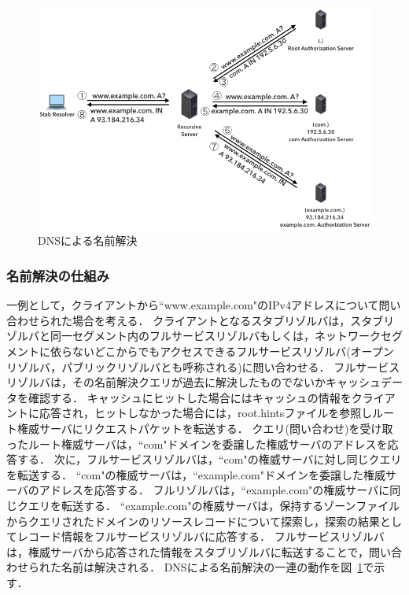 \begin{figure}[h]
 \centering
 \includegraphics[width=12.0cm]{figure/dns-name-resolution.png}
 \caption{DNSによる名前解決}
 \label{fig:dns-name-resolution}
\end{figure}

\subsubsection{名前解決の仕組み}
\label{sec:dns-mechanism}
一例として，クライアントから``www.example.com"のIPv4アドレスについて問い合わせられた場合を考える．
クライアントとなるスタブリゾルバは，スタブリゾルバと同一セグメント内のフルサービスリゾルバもしくは，ネットワークセグメントに依らないどこからでもアクセスできるフルサービスリゾルバ(オープンリゾルバ，パブリックリゾルバとも呼称される)に問い合わせる．
フルサービスリゾルバは，その名前解決クエリが過去に解決したものでないかキャッシュデータを確認する．
キャッシュにヒットした場合にはキャッシュの情報をクライアントに応答され，ヒットしなかった場合には，root.hintsファイルを参照しルート権威サーバにリクエストパケットを転送する．
クエリ(問い合わせ)を受け取ったルート権威サーバは，``com"ドメインを委譲した権威サーバのアドレスを応答する．
次に，フルサービスリゾルバは，``com"の権威サーバに対し同じクエリを転送する．
``com"の権威サーバは，``example.com"ドメインを委譲した権威サーバのアドレスを応答する．
フルリゾルバは，``example.com"の権威サーバに同じクエリを転送する．
``example.com"の権威サーバは，保持するゾーンファイルからクエリされたドメインのリソースレコードについて探索し，探索の結果としてレコード情報をフルサービスリゾルバに応答する．
フルサービスリゾルバは，権威サーバから応答された情報をスタブリゾルバに転送することで，問い合わせられた名前は解決される．
DNSによる名前解決の一連の動作を図~\ref{fig:dns-name-resolution}で示す．

